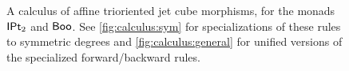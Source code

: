 \documentclass[a4paper]{memoir}
\begin{document}
\begin{figure}
	\caption{A calculus of affine trioriented jet cube morphisms, for the monads ${\mathsf{IPt}_2}$ and $\mathsf{Boo}$. See \cref{fig:calculus:sym} for specializations of these rules to symmetric degrees and \cref{fig:calculus:general} for unified versions of the specialized forward/backward rules.}
	\label{fig:calculus}
\end{figure}
\end{document}

